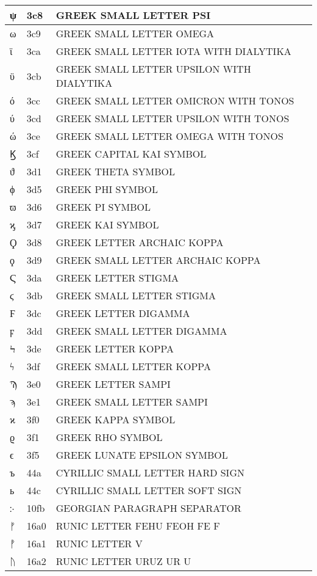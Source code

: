\documentclass[12pt,letterpaper,openany]{book}
\begin{document}
\begin{center}
\begin{supertabular}{|m{0.25in}|m{0.5in}|m{4in}|}
ψ & 3c8 & GREEK SMALL LETTER PSI\\\hline
ω & 3c9 & GREEK SMALL LETTER OMEGA\\\hline
ϊ & 3ca & GREEK SMALL LETTER IOTA WITH DIALYTIKA\\\hline
ϋ & 3cb & GREEK SMALL LETTER UPSILON WITH DIALYTIKA\\\hline
ό & 3cc & GREEK SMALL LETTER OMICRON WITH TONOS\\\hline
ύ & 3cd & GREEK SMALL LETTER UPSILON WITH TONOS\\\hline
ώ & 3ce & GREEK SMALL LETTER OMEGA WITH TONOS\\\hline
Ϗ & 3cf & GREEK CAPITAL KAI SYMBOL\\\hline
ϑ & 3d1 & GREEK THETA SYMBOL\\\hline
ϕ & 3d5 & GREEK PHI SYMBOL\\\hline
ϖ & 3d6 & GREEK PI SYMBOL\\\hline
ϗ & 3d7 & GREEK KAI SYMBOL\\\hline
Ϙ & 3d8 & GREEK LETTER ARCHAIC KOPPA\\\hline
ϙ & 3d9 & GREEK SMALL LETTER ARCHAIC KOPPA\\\hline
Ϛ & 3da & GREEK LETTER STIGMA\\\hline
ϛ & 3db & GREEK SMALL LETTER STIGMA\\\hline
Ϝ & 3dc & GREEK LETTER DIGAMMA\\\hline
ϝ & 3dd & GREEK SMALL LETTER DIGAMMA\\\hline
Ϟ & 3de & GREEK LETTER KOPPA\\\hline
ϟ & 3df & GREEK SMALL LETTER KOPPA\\\hline
Ϡ & 3e0 & GREEK LETTER SAMPI\\\hline
ϡ & 3e1 & GREEK SMALL LETTER SAMPI\\\hline
ϰ & 3f0 & GREEK KAPPA SYMBOL\\\hline
ϱ & 3f1 & GREEK RHO SYMBOL\\\hline
ϵ & 3f5 & GREEK LUNATE EPSILON SYMBOL\\\hline
ъ & 44a & CYRILLIC SMALL LETTER HARD SIGN\\\hline
ь & 44c & CYRILLIC SMALL LETTER SOFT SIGN\\\hline
჻ & 10fb & GEORGIAN PARAGRAPH SEPARATOR\\\hline
ᚠ & 16a0 & RUNIC LETTER FEHU FEOH FE F\\\hline
ᚡ & 16a1 & RUNIC LETTER V\\\hline
ᚢ & 16a2 & RUNIC LETTER URUZ UR U\\\hline

\end{supertabular}
\end{center}
\end{document}
